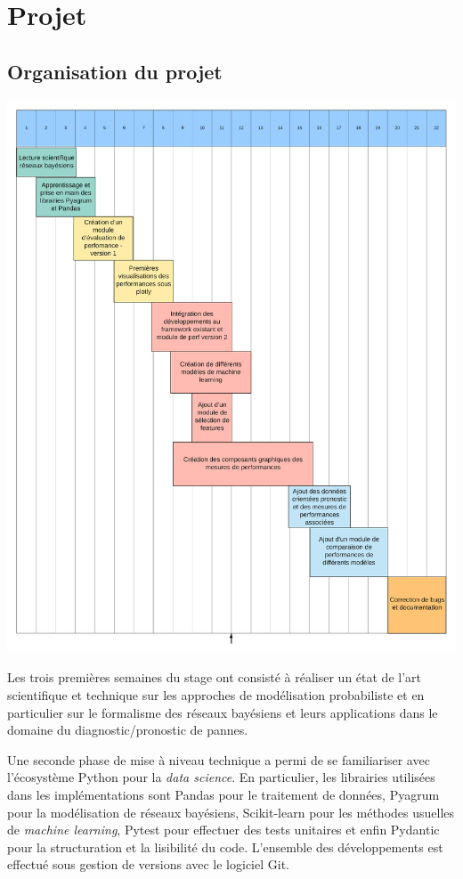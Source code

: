 \chapter{Projet}

\section{Organisation du projet}

\begin{center}
\includegraphics[scale=0.3]{figures/Rapport_GANTT.png}
\label{fig1}
\end{center}

Les trois premières semaines du stage ont consisté à réaliser un état de l’art scientifique et technique sur les approches de modélisation probabiliste et en particulier sur le formalisme des réseaux bayésiens et leurs applications  dans le domaine du diagnostic/pronostic de pannes.

Une seconde phase de mise à niveau technique a permi de se familiariser avec  l’écosystème Python pour la \textit{data science}. En particulier, les librairies utilisées dans les implémentations sont Pandas pour le traitement de données, Pyagrum pour la modélisation de réseaux bayésiens, Scikit-learn pour les  méthodes usuelles de \textit{machine learning}, Pytest pour effectuer des tests unitaires et enfin Pydantic pour la structuration et la lisibilité du code. L’ensemble des développements est effectué sous gestion de versions avec le logiciel Git.

